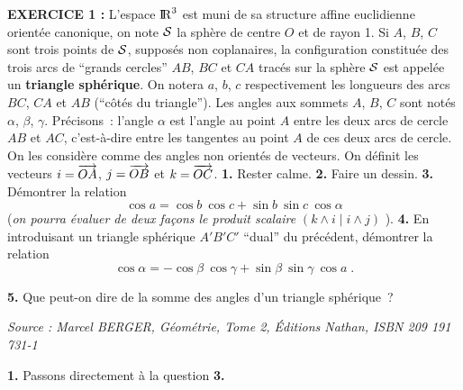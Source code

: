 \documentclass{article}
\begin{document}
{\bf EXERCICE 1 :}\msk
L'espace ${\rm I\kern-0.6mm R}^3$ est muni de sa structure affine euclidienne orient\'ee canonique, on note ${\cal S}$ la sph\`ere de centre $O$ et de rayon 1.\msk
Si $A$, $B$, $C$ sont trois points de ${\cal S}$, suppos\'es non coplanaires, la configuration constitu\'ee des trois arcs de ``grands cercles'' $AB$, $BC$ et $CA$ trac\'es sur la sph\`ere ${\cal S}$ est appel\'ee un {\bf triangle sph\'erique}.\ssk
On notera $a$, $b$, $c$ respectivement les longueurs des arcs $BC$, $CA$ et $AB$ (``c\^ot\'es du triangle'').\ssk
Les angles aux sommets $A$, $B$, $C$ sont not\'es $\alpha$, $\beta$, $\gamma$. Pr\'ecisons~: l'angle $\alpha$ est l'angle au point $A$ entre les deux arcs de cercle $AB$ et $AC$, c'est-\`a-dire entre les tangentes au point $A$ de ces deux arcs de cercle. On les consid\`ere comme des angles non orient\'es de vecteurs.\ssk
On d\'efinit les vecteurs $i=\vect{OA}$, $j=\vect{OB}$ et $k=\vect{OC}$.
\msk
{\bf 1.} Rester calme.\msk
{\bf 2.} Faire un dessin.\msk
{\bf 3.} D\'emontrer la relation\vv
$$\cos a=\cos b\>\cos c+\sin b\>\sin c\>\cos \alpha$$
({\it on pourra \'evaluer de deux fa\c cons le produit scalaire} $(k\wedge i\;|\;i\wedge j)$ ).
\msk
{\bf 4.} En introduisant un triangle sph\'erique $A'B'C'$ ``dual'' du pr\'ec\'edent, d\'emontrer la relation\vv
$$\cos\alpha=-\cos\beta\>\cos\gamma+\sin\beta\>\sin\gamma\>\cos a\;.$$\par
{\bf 5.} Que peut-on dire de la somme des angles d'un triangle sph\'erique~?

\msk

{\it Source : Marcel BERGER, G\'eom\'etrie, Tome 2, \'Editions Nathan, ISBN 209 191 731-1}


\msk
\cl{- - - - - - - - - - - - - - - - - - - - - - - - - - - - - -}
\msk

{\bf 1.} Passons directement \`a la question {\bf 3.}\msk
\end{document}
